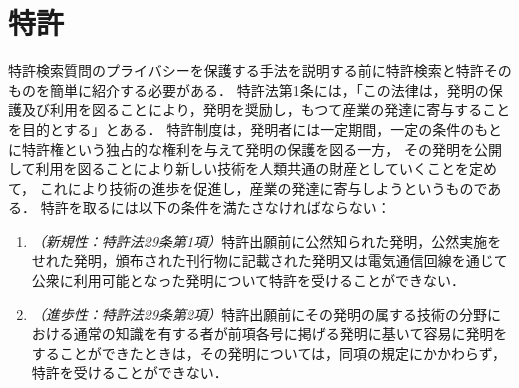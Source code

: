 \documentclass[master]{suribt}
\theoremstyle{definition}
\begin{document}
 \chapter{特許}
 特許検索質問のプライバシーを保護する手法を説明する前に特許検索と特許そのものを簡単に紹介する必要がある．
 特許法第1条には，「この法律は，発明の保護及び利用を図ることにより，発明を奨励し，もつて産業の発達に寄与することを目的とする」とある．
 特許制度は，発明者には一定期間，一定の条件のもとに特許権という独占的な権利を与えて発明の保護を図る一方，
 その発明を公開して利用を図ることにより新しい技術を人類共通の財産としていくことを定めて，
 これにより技術の進歩を促進し，産業の発達に寄与しようというものである．
 特許を取るには以下の条件を満たさなければならない：
 \begin{enumerate}
 \item {\em （新規性：特許法29条第1項）}特許出願前に公然知られた発明，公然実施をせれた発明，頒布された刊行物に記載された発明又は電気通信回線を通じて公衆に利用可能となった発明について特許を受けることができない．
 \item {\em （進歩性：特許法29条第2項）}特許出願前にその発明の属する技術の分野における通常の知識を有する者が前項各号に掲げる発明に基いて容易に発明をすることができたときは，その発明については，同項の規定にかかわらず，特許を受けることができない．
 \end{enumerate}
\end{document}
